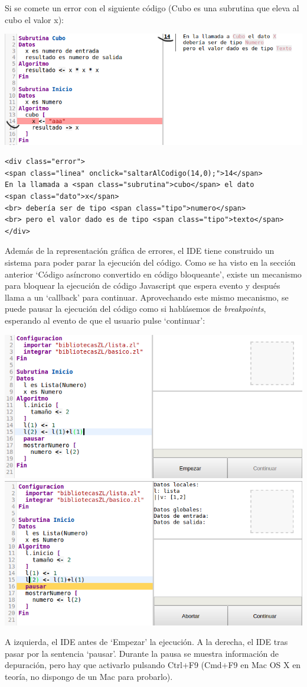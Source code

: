 \documentclass{report}
\begin{document}
	Si se comete un error con el siguiente código (Cubo es una subrutina que eleva al cubo el valor x):
	
	\begin{center}
		\includegraphics[width=1\linewidth]{error}
	\end{center}
	
	\begin{BVerbatim}
<div class="error">
<span class="linea" onclick="saltarAlCodigo(14,0);">14</span>
En la llamada a <span class="subrutina">cubo</span> el dato 
<span class="dato">x</span>
<br> debería ser de tipo <span class="tipo">numero</span>
<br> pero el valor dado es de tipo <span class="tipo">texto</span>
</div>
	\end{BVerbatim}
	
	\vspace{10px}
	
	Además de la representación gráfica de errores, el IDE tiene construido un sistema para poder parar la ejecución del código. Como se ha visto en la sección anterior `Código asíncrono convertido en código bloqueante', existe un mecanismo para bloquear la ejecución de código Javascript que espera evento y después llama a un `callback' para continuar. Aprovechando este mismo mecanismo, se puede pausar la ejecución del código como si hablásemos de \textit{breakpoints}\cite{breakpoint}, esperando al evento de que el usuario pulse `continuar':
	
	
	\begin{center}
	\includegraphics[width=0.45\linewidth]{pausa1}
	\includegraphics[width=0.45\linewidth]{pausa2}
	
	A izquierda, el IDE antes de `Empezar' la ejecución. A la derecha, el IDE tras pasar por la sentencia `pausar'. Durante la pausa se muestra información de depuración, pero hay que activarlo pulsando Ctrl+F9 (Cmd+F9 en Mac OS X en teoría, no dispongo de un Mac para probarlo).
	\end{center}
\end{document}
